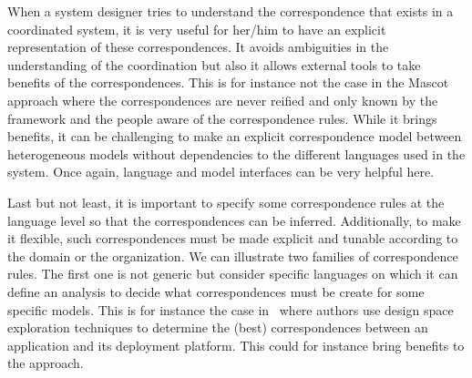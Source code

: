 




When a system designer tries to understand the correspondence that exists in a coordinated system, it is very useful for her/him to have an explicit representation of these correspondences. It avoids ambiguities in the understanding of the coordination but also it allows external tools to take benefits of the correspondences. This is for instance not the case in the Mascot approach where the correspondences are never reified and only known by the framework and the people aware of the correspondence rules. While it brings benefits, it can be challenging to make an explicit correspondence model between heterogeneous models without dependencies to the different languages used in the system. Once again, language and model interfaces can be very helpful here. 

Last but not least, it is important to specify some correspondence rules at the language level so that the correspondences can be inferred. Additionally, to make it flexible, such correspondences must be made explicit and tunable according to the domain or the organization. 
We can illustrate two families of correspondence rules.
The first one is not generic but consider specific languages on which it can define an analysis to decide what correspondences must be create for some specific models. This is for instance the case in~\cite{kofmanbib} where authors use design space exploration techniques to determine the (best) correspondences between an application and its deployment platform. This could for instance bring benefits to the \cite{dinatale} approach.

